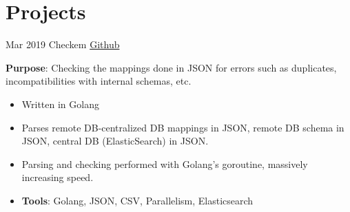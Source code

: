 \documentclass[letterpaper]{twentysecondcv} %
\begin{document}
\section{Projects}
\begin{twenty}
	\twentyitem
    	{Mar 2019}
		{}
        {Checkem}
        {\href{https://github.com/aschereT/checkem/}{Github}}
        {}
        {
       	\textbf{Purpose}: Checking the mappings done in JSON for errors such as duplicates, incompatibilities with internal schemas, etc.
        {\begin{itemize}
        \item Written in Golang
        \item Parses remote DB-centralized DB mappings in JSON, remote DB schema in JSON, central DB (ElasticSearch) in JSON.
        \item Parsing and checking performed with Golang's goroutine, massively increasing speed.
        \item \textbf{Tools}: Golang, JSON, CSV, Parallelism, Elasticsearch \vspace{2mm}
		\end{itemize}}
        }
\end{twenty}

\end{document}
